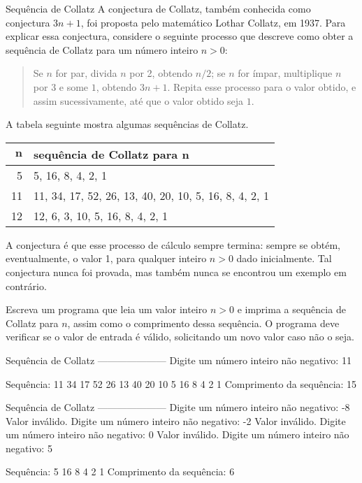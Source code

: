\documentclass[11pt,fleqn]{practice}
\begin{document}
\begin{task}[breakable]{Sequência de Collatz}{}
  A conjectura de Collatz, também conhecida como conjectura $3n+1$, foi
  proposta pelo matemático Lothar Collatz, em 1937. Para explicar essa
  conjectura, considere o seguinte processo que descreve como obter a
  sequência de Collatz para um número inteiro $n>0$:

  \begin{quote}
    Se $n$ for par, divida $n$ por 2, obtendo $n/2$; se $n$ for ímpar,
    multiplique $n$ por $3$ e some $1$, obtendo $3n+1$. Repita esse
    processo para o valor obtido, e assim sucessivamente, até que o
    valor obtido seja $1$.
  \end{quote}

  A tabela seguinte mostra algumas sequências de Collatz.
  \begin{center}
    \begin{tabular}{|r|l|} \hline
      $\mathbf{n}$ & \textbf{sequência de Collatz para $\mathbf{n}$} \\\hline
      5 & 5, 16, 8, 4, 2, 1 \\\hline
      11 & 11, 34, 17, 52, 26, 13, 40, 20, 10, 5, 16, 8, 4, 2, 1 \\\hline
      12 & 12, 6, 3, 10, 5, 16, 8, 4, 2, 1 \\\hline
    \end{tabular}
  \end{center}

  A conjectura é que esse processo de cálculo sempre termina: sempre se
  obtém, eventualmente, o valor 1, para qualquer inteiro $n>0$ dado
  inicialmente. Tal conjectura nunca foi provada, mas também nunca se
  encontrou um exemplo em contrário.

  Escreva um programa que leia um valor inteiro $n>0$ e imprima a
  sequência de Collatz para $n$, assim como o comprimento dessa
  sequência. O programa deve verificar se o valor de entrada é válido,
  solicitando um novo valor caso não o seja.

  \begin{runexample}
Sequência de Collatz
---------------------
Digite um número inteiro não negativo: 11

Sequência: 11 34 17 52 26 13 40 20 10 5 16 8 4 2 1
Comprimento da sequência: 15
  \end{runexample}

  \begin{runexample}
Sequência de Collatz
---------------------
Digite um número inteiro não negativo: -8
Valor inválido.
Digite um número inteiro não negativo: -2
Valor inválido.
Digite um número inteiro não negativo: 0
Valor inválido.
Digite um número inteiro não negativo: 5

Sequência: 5 16 8 4 2 1
Comprimento da sequência: 6
  \end{runexample}

  \tcblower
  \solution
\end{task}
\end{document}
